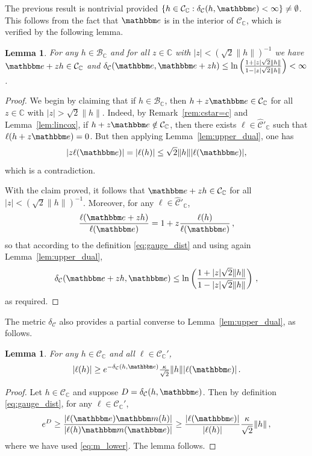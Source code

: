 \documentclass{amsart}
\numberwithin{equation}{section}
\newtheorem{lem}[thm]{Lemma}
\newcommand\cB{{\mathcal B}}
\newcommand\cC{{\mathcal C}}
\newcommand\bC{{\mathbb C}}
\newcommand{\bbe}{\mathbbm e}
\newcommand{\bbm}{\mathbbm m}
\begin{document}
The previous result is nontrivial provided $\{ h \in \cC_{\bC} : \delta_{\cC}(h , \bbe) < \infty \} \neq \emptyset$.  This
follows from the fact that $\bbe$ is in the interior of $\cC_{\bC}$, which is verified by the following lemma. 

\begin{lem}
\label{lem:interior}
For any $h \in \cB_{\bC}$ and for all $z \in \mathbb{\bC}$ with $|z| < (\sqrt{2} \|h\|)^{-1}$ we have
$\bbe + z h \in \cC_{\bC}$ and $\delta_{\cC}(\bbe, \bbe + z h) \le \ln \left( \frac{1 + |z| \sqrt{2} \| h \| }{ 1 - |z| \sqrt{2} \| h \| } \right) < \infty$.
\end{lem}

\begin{proof}
We begin by claiming that if $h \in \cB_{\bC}$, then $h + z \bbe \in \cC_{\bC}$ for all $z \in \bC$ with $|z| > \sqrt{2} \| h\|$.  
Indeed, by Remark~\ref{rem:cstar=c} and Lemma~\ref{lem:lincox}, if $h + z \bbe \notin \cC_{\bC}$, then
there exists $\ell \in \hat{\cC}'_{\bC}$ such that $\ell(h + z \bbe) = 0$.  But then applying Lemma~\ref{lem:upper_dual}, one has
\[
| z \ell(\bbe) | = | \ell(h)| \le  \sqrt{2} \| h \| | \ell(\bbe) | ,
\]
which is a contradiction.

With the claim proved, it follows that $\bbe + z h \in \cC_{\bC}$ for all $|z| < (\sqrt{2} \|h \|)^{-1}$.  Moreover, for any
$\ell \in \hat{\cC}'_{\bC}$,
\[
\frac{\ell(\bbe + z h)}{\ell(\bbe)} = 1 + z \frac{\ell(h)}{\ell(\bbe)} \, ,
\]
so that according to the definition \eqref{eq:gauge_dist} and using again Lemma~\ref{lem:upper_dual}, 
\[
\delta_{\cC}(\bbe + z h, \bbe) \le \ln \left( \frac{1 + |z| \sqrt{2} \| h \| }{ 1 - |z| \sqrt{2} \| h \| } \right) \, ,
\]
as required.
\end{proof}

The metric $\delta_{\cC}$ also provides a partial converse to Lemma~\ref{lem:upper_dual}, as follows.
\begin{lem}
\label{lem:partial converse}
For any $h \in \cC_{\bC}$ and all $\ell \in \cC_{\bC}'$,
\[
|\ell(h)| \ge e^{- \delta_{\cC}(h, \bbe)} \tfrac{\kappa}{\sqrt{2}} \| h \| |\ell(\bbe)| \, .
\]
\end{lem}

\begin{proof}
Let $h \in \cC_{\bC}$ and suppose $D = \delta_{\cC}(h , \bbe)$.  Then by definition \eqref{eq:gauge_dist},
for any $\ell \in \cC_{\bC}'$, 
\[
e^D \ge \frac{|\ell(\bbe) \bbm(h)|}{|\ell(h) \bbm(\bbe)|} \ge \frac{|\ell(\bbe)|}{|\ell(h)|} \frac{\kappa}{\sqrt{2}} \| h \| \, ,
\]
where we have used \eqref{eq:m_lower}.  The lemma follows.
\end{proof}
\end{document}
